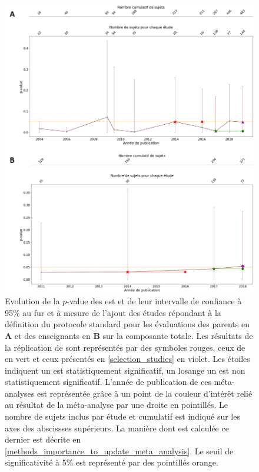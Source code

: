 \begin{figure}[t]
  \centering
	\includegraphics[width=1\linewidth]{figures/chapter-2/meta-analysis-evolution-pvalue-std} 
  \caption[Evolution de la $p$-value des \gls{est} au fur et à mesure de l'ajout de nouvelles études suivant un protocole standard.]{Evolution de la $p$-value 
	des \gls{est} et de leur intervalle de confiance à 95\% au fur et à mesure de l'ajout des études répondant à la définition du protocole standard pour les évaluations des 
	parents en \textbf{A} et des enseignants en \textbf{B} sur la composante totale.
  Les résultats de la réplication de \citet{Cortese2016} sont représentés par des symboles rouges, ceux de \citet{Bussalb2019clinical} en vert et ceux présentés en \ref{selection_studies} en violet. Les étoiles 
	indiquent un \gls{est} statistiquement significatif, un losange un \gls{est} non statistiquement significatif. L'année de publication de ces méta-analyses est représentée grâce à un point de la couleur 
	d'intérêt relié au résultat de la méta-analyse par une droite en pointillés.
	Le nombre de sujets inclus par étude et cumulatif est indiqué sur les axes des abscissses supérieurs. La manière dont est calculée ce dernier est 
	décrite en \ref{methods_importance_to_update_meta_analysis}.
	Le seuil de significativité à 5\% est représenté par des pointillés orange.}
  \label{Figure:meta_analysis_evolution_pvalue_std}
\end{figure}

